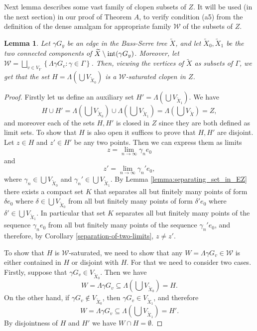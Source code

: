 \documentclass[12pt, a4paper]{article}
\newcommand{\8}{\infty}
\newcommand{\set}[1]{\left\{ #1 \right\}}
\theoremstyle{break}
\newtheorem{lm}[thm]{Lemma}
\theoremstyle{defbreak}
\newcommand{\wtl}[1]{\widetilde{#1}}
\begin{document}
Next lemma describes some vast family of clopen subsets of $Z$.
It will be used (in the next section) in our proof of Theorem $A$,
to verify condition (a5) from the definition of the dense amalgam
for appropriate family $\mathcal{W}$ of the subsets of $Z$.\medskip

\begin{lm}\label{lemma:H_W-saturated}
    Let $\gamma G_y$ be an edge in the Bass-Serre tree $\wtl{X}$, and let $\wtl{X}_0, \wtl{X}_1$ be the two connected components of ${\wtl{X}\setminus\hbox{\rm int}(\gamma G_y)}$. Moreover, let $\mathcal{W} = \bigsqcup_{v\in V_Y} \set{\Lambda\gamma G_v:\gamma\in \Gamma}$. Then, viewing the vertices of $\wtl{X}$ as subsets of $\Gamma$, we get that the set $H = \Lambda(\bigcup V_{\wtl{X}_0})$ is a $\mathcal{W}$-saturated clopen in $Z$. 
\end{lm}

\begin{proof}
    Firstly let us define an auxiliary set $H' = \Lambda(\bigcup V_{\wtl{X}_1})$. We have 
    $$H\cup H' = \Lambda(\bigcup V_{\wtl{X}_0})\cup \Lambda(\bigcup V_{\wtl{X}_1}) = \Lambda(\bigcup V_{\wtl{X}}) = Z,$$
    and moreover each of the sets $H,H'$ is closed in $Z$ since they are both defined as limit sets. To show that $H$ is also open it suffices to prove that $H, H'$ are disjoint. Let $z \in H$ and $z'\in H'$ be any two points. Then we can express them as limits 
    $$z = \lim_{n\to \8} \gamma_ne_0$$
    and
    $$z' = \lim_{n\to \8} \gamma_n'e_0,$$
    where $\gamma_n\in \bigcup V_{\wtl{X}_0}$ and $\gamma_n'\in \bigcup V_{\wtl{X}_1}$. By Lemma \ref{lemma:separating_set_in_EZ} there exists a compact set $K$ that separates all but finitely many points of form $\delta e_0$ where $\delta\in \bigcup V_{\wtl{X}_0}$ from all but finitely many points of form $\delta' e_0$ where $\delta'\in \bigcup V_{\wtl{X}_1}$. In particular that set $K$ separates all but finitely many points of the sequence $\gamma_ne_0$ from all but finitely many points of the sequence $\gamma_n'e_0$, and therefore, by Corollary \ref{separation-of-two-limits}, $z\neq z'$.

    To show that $H$ is $\mathcal{W}$-saturated, we need to show that any $W = \Lambda \gamma G_v \in \mathcal{W}$ is either contained in $H$ or disjoint with $H$. For that we need to consider two cases. Firstly, suppose that $\gamma G_v \in V_{\wtl{X}_0}$. Then we have
    $$W = \Lambda \gamma G_v \subseteq \Lambda (\bigcup V_{\wtl{X}_0}) = H.$$
    On the other hand, if $\gamma G_v\not\in V_{\wtl{X}_0}$, then $\gamma G_v\in V_{\wtl{X}_1}$, and therefore
    $$W = \Lambda \gamma G_v \subseteq \Lambda (\bigcup V_{\wtl{X}_1}) = H'.$$
    By disjointness of $H$ and $H'$ we have $W \cap H = \emptyset$.
\end{proof}
\end{document}
